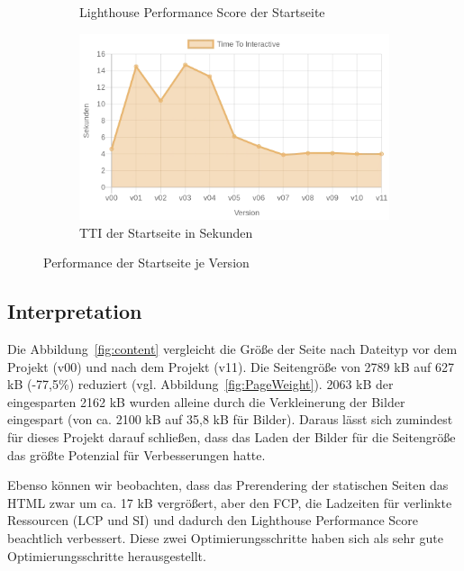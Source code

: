 \documentclass[11pt,a4paper]{article}
\begin{document}
\begin{figure}[h]
\begin{subfigure}{.5\textwidth}
    \caption{Lighthouse Performance Score der Startseite}
    \label{fig:LHScore}
  \end{subfigure}
  \begin{subfigure}{.5\textwidth}
    \centering
    \includegraphics[width=.8\linewidth]{images/TTI.png}
    \caption{TTI der Startseite in Sekunden}
    \label{fig:TTI}
  \end{subfigure}
  \caption{Performance der Startseite je Version}
  \label{fig:performance}
\end{figure}

\subsection{Interpretation}
Die Abbildung~\ref{fig:content} vergleicht die Größe der Seite nach Dateityp vor dem Projekt (v00) und nach dem Projekt (v11).
Die Seitengröße von 2789 kB auf 627 kB (-77,5\%) reduziert (vgl. Abbildung~\ref{fig:PageWeight}).
2063 kB der eingesparten 2162 kB wurden alleine durch die Verkleinerung der Bilder eingespart (von ca. 2100 kB auf 35,8 kB für Bilder).
Daraus lässt sich zumindest für dieses Projekt darauf schließen, dass das Laden der Bilder für die Seitengröße das größte Potenzial für Verbesserungen hatte.

Ebenso können wir beobachten, dass das Prerendering der statischen Seiten das HTML zwar um ca. 17 kB vergrößert, aber den FCP, die Ladzeiten für verlinkte Ressourcen (LCP und SI) und dadurch den Lighthouse Performance Score beachtlich verbessert.
Diese zwei Optimierungsschritte haben sich als sehr gute Optimierungsschritte herausgestellt.
\end{document}
